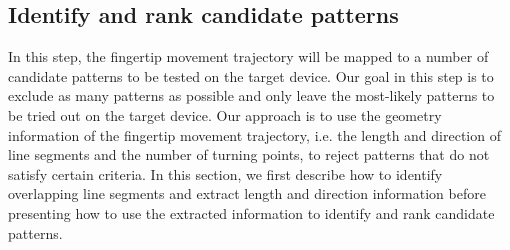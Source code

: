 \vspace{-3mm}
\subsection{Identify and rank candidate patterns}
\label{section:spea}
  In this step, the fingertip movement trajectory will be mapped to a number of candidate patterns to be tested on the target device.
   Our goal in this step is to exclude as many patterns as possible and only leave the most-likely patterns to be tried out on the target device.
     Our approach is to use the geometry information of the fingertip movement trajectory, i.e. the length and direction of line segments and the number of turning points, to reject patterns that do not satisfy certain criteria.
    In this section, we first describe how to identify overlapping line segments and extract length and direction information before presenting how to use the extracted information to identify and rank candidate patterns.

